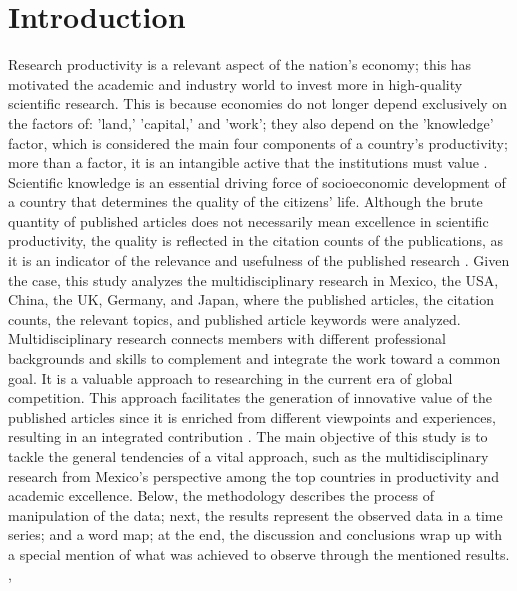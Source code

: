 \documentclass[conference]{IEEEtran}
\begin{document}
\section{Introduction}
 \label{sec:Introduction}
Research productivity is a relevant aspect of the nation's economy; this has motivated the academic and industry world to invest more in high-quality scientific research. This is because economies do not longer depend exclusively on the factors of: 'land,' 'capital,' and 'work'; they also depend on the 'knowledge' factor, which is considered the main four components of a country's productivity; more than a factor, it is an intangible active that the institutions must value \cite{Rojas2020}. Scientific knowledge is an essential driving force of socioeconomic development of a country that determines the quality of the citizens' life. Although the brute quantity of published articles does not necessarily mean excellence in scientific productivity, the quality is reflected in the citation counts of the publications, as it is an indicator of the relevance and usefulness of the published research \cite{Lima2022}. Given the case, this study analyzes the multidisciplinary research in Mexico, the USA, China, the UK, Germany, and Japan, where the published articles, the citation counts, the relevant topics, and published article keywords were analyzed. Multidisciplinary research connects members with different professional backgrounds and skills to complement and integrate the work toward a common goal. It is a valuable approach to researching in the current era of global competition. This approach facilitates the generation of innovative value of the published articles since it is enriched from different viewpoints and experiences, resulting in an integrated contribution \cite{Tang2013}. The main objective of this study is to tackle the general tendencies of a vital approach, such as the multidisciplinary research from Mexico's perspective among the top countries in productivity and academic excellence. Below, the methodology describes the process of manipulation of the data; next, the results represent the observed data in a time series; and a word map; at the end, the discussion and conclusions wrap up with a special mention of what was achieved to observe through the mentioned results.
, %
\end{document}
